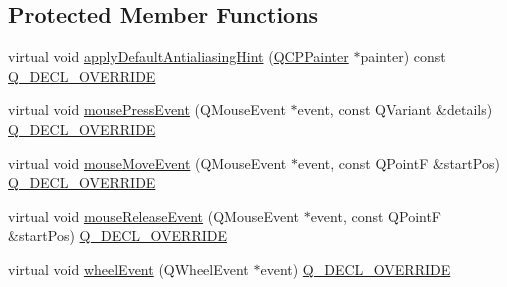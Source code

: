 \subsection*{Protected Member Functions}
\begin{DoxyCompactItemize}
\item 
virtual void \mbox{\hyperlink{class_q_c_p_color_scale_af1b24d24a70f25b65d29f09e413390a8}{apply\+Default\+Antialiasing\+Hint}} (\mbox{\hyperlink{class_q_c_p_painter}{Q\+C\+P\+Painter}} $\ast$painter) const \mbox{\hyperlink{qcustomplot_8h_a42cc5eaeb25b85f8b52d2a4b94c56f55}{Q\+\_\+\+D\+E\+C\+L\+\_\+\+O\+V\+E\+R\+R\+I\+DE}}
\item 
virtual void \mbox{\hyperlink{class_q_c_p_color_scale_a91f633b97ffcd57fdf8cd814974c20e6}{mouse\+Press\+Event}} (Q\+Mouse\+Event $\ast$event, const Q\+Variant \&details) \mbox{\hyperlink{qcustomplot_8h_a42cc5eaeb25b85f8b52d2a4b94c56f55}{Q\+\_\+\+D\+E\+C\+L\+\_\+\+O\+V\+E\+R\+R\+I\+DE}}
\item 
virtual void \mbox{\hyperlink{class_q_c_p_color_scale_a3b2bd79725aefaf2630fc76e90939442}{mouse\+Move\+Event}} (Q\+Mouse\+Event $\ast$event, const Q\+PointF \&start\+Pos) \mbox{\hyperlink{qcustomplot_8h_a42cc5eaeb25b85f8b52d2a4b94c56f55}{Q\+\_\+\+D\+E\+C\+L\+\_\+\+O\+V\+E\+R\+R\+I\+DE}}
\item 
virtual void \mbox{\hyperlink{class_q_c_p_color_scale_a6a35dd39ab4e5cb2d7b29ebb4d5b61b0}{mouse\+Release\+Event}} (Q\+Mouse\+Event $\ast$event, const Q\+PointF \&start\+Pos) \mbox{\hyperlink{qcustomplot_8h_a42cc5eaeb25b85f8b52d2a4b94c56f55}{Q\+\_\+\+D\+E\+C\+L\+\_\+\+O\+V\+E\+R\+R\+I\+DE}}
\item 
virtual void \mbox{\hyperlink{class_q_c_p_color_scale_a63cf19be184f6670c9495ad3a9a1baeb}{wheel\+Event}} (Q\+Wheel\+Event $\ast$event) \mbox{\hyperlink{qcustomplot_8h_a42cc5eaeb25b85f8b52d2a4b94c56f55}{Q\+\_\+\+D\+E\+C\+L\+\_\+\+O\+V\+E\+R\+R\+I\+DE}}
\end{DoxyCompactItemize}
